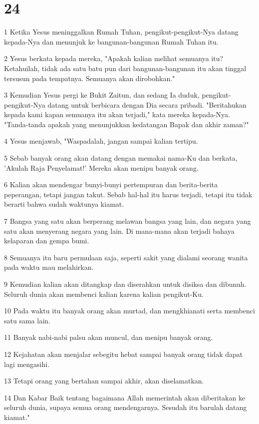 \chapter{24}

\par 1 Ketika Yesus meninggalkan Rumah Tuhan, pengikut-pengikut-Nya datang kepada-Nya dan menunjuk ke bangunan-bangunan Rumah Tuhan itu.
\par 2 Yesus berkata kepada mereka, "Apakah kalian melihat semuanya itu? Ketahuilah, tidak ada satu batu pun dari bangunan-bangunan itu akan tinggal tersusun pada tempatnya. Semuanya akan dirobohkan."
\par 3 Kemudian Yesus pergi ke Bukit Zaitun, dan sedang Ia duduk, pengikut-pengikut-Nya datang untuk berbicara dengan Dia secara pribadi. "Beritahukan kepada kami kapan semuanya itu akan terjadi," kata mereka kepada-Nya. "Tanda-tanda apakah yang menunjukkan kedatangan Bapak dan akhir zaman?"
\par 4 Yesus menjawab, "Waspadalah, jangan sampai kalian tertipu.
\par 5 Sebab banyak orang akan datang dengan memakai nama-Ku dan berkata, 'Akulah Raja Penyelamat!' Mereka akan menipu banyak orang.
\par 6 Kalian akan mendengar bunyi-bunyi pertempuran dan berita-berita peperangan, tetapi jangan takut. Sebab hal-hal itu harus terjadi, tetapi itu tidak berarti bahwa sudah waktunya kiamat.
\par 7 Bangsa yang satu akan berperang melawan bangsa yang lain, dan negara yang satu akan menyerang negara yang lain. Di mana-mana akan terjadi bahaya kelaparan dan gempa bumi.
\par 8 Semuanya itu baru permulaan saja, seperti sakit yang dialami seorang wanita pada waktu mau melahirkan.
\par 9 Kemudian kalian akan ditangkap dan diserahkan untuk disiksa dan dibunuh. Seluruh dunia akan membenci kalian karena kalian pengikut-Ku.
\par 10 Pada waktu itu banyak orang akan murtad, dan mengkhianati serta membenci satu sama lain.
\par 11 Banyak nabi-nabi palsu akan muncul, dan menipu banyak orang.
\par 12 Kejahatan akan menjalar sebegitu hebat sampai banyak orang tidak dapat lagi mengasihi.
\par 13 Tetapi orang yang bertahan sampai akhir, akan diselamatkan.
\par 14 Dan Kabar Baik tentang bagaimana Allah memerintah akan diberitakan ke seluruh dunia, supaya semua orang mendengarnya. Sesudah itu barulah datang kiamat."
